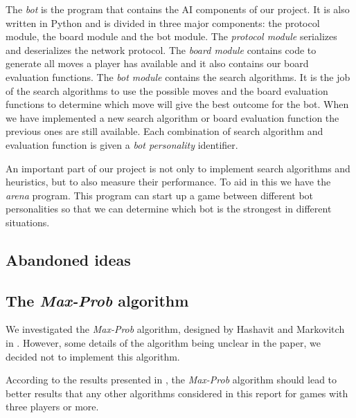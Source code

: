 \documentclass[a4paper,11pt]{article}
\begin{document}
The \emph{bot} is the program that contains the AI components of our
project. It is also written in Python and is divided in three major
components: the protocol module, the board module and the bot module.
The \emph{protocol module} serializes and deserializes the network protocol.
The \emph{board module} contains code to generate all moves a player has
available and it also contains our board evaluation functions. The
\emph{bot module} contains the search algorithms. It is the job of the search
algorithms to use the possible moves and the board evaluation
functions to determine which move will give the best outcome for the
bot. When we have implemented a new search algorithm or board
evaluation function the previous ones are still available. Each
combination of search algorithm and evaluation function is given a
\emph{bot personality} identifier.

An important part of our project is not only to implement search
algorithms and heuristics, but to also measure their performance. To
aid in this we have the \emph{arena} program. This program can start
up a game between different bot personalities so that we can determine
which bot is the strongest in different situations.



\subsection{Abandoned ideas}
\subsection{The \textit{Max-Prob} algorithm}
We investigated the \textit{Max-Prob} algorithm, designed by Hashavit and
Markovitch in \cite{Hashavit}. However, some details of the algorithm being
unclear in the paper, we decided not to implement this algorithm.

According to the results presented in \cite{Hashavit}, the \textit{Max-Prob}
algorithm should lead to better results that any other algorithms considered
in this report for games with three players or more.
\end{document}
